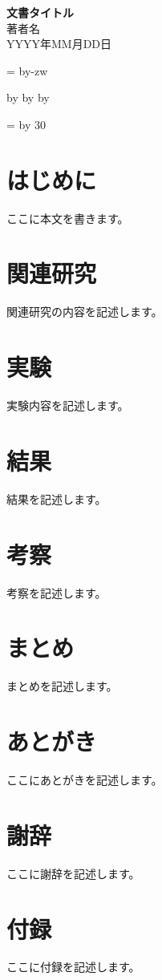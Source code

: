 \documentclass[a4paper,10.5pt]{jsarticle}
\makeatletter
\def\mojiparline#1{
    \newcounter{mpl}
    \setcounter{mpl}{#1}
    \@tempdima=\linewidth
    \advance\@tempdima by-\value{mpl}zw
    \addtocounter{mpl}{-1}
    \divide\@tempdima by \value{mpl}
    \advance\kanjiskip by\@tempdima
    \advance\parindent by\@tempdima
}
\def\linesparpage#1{
    \baselineskip=\textheight
    \divide\baselineskip by #1
}
\makeatother
\begin{document}
\begin{titlepage}
\centering
\vspace*{\fill}
{\Huge\bfseries 文書タイトル} \\[2cm]
	{\large 著者名} \\[0.5cm]
	\vspace*{\fill}
	{\large YYYY年MM月DD日} %
\end{titlepage}

\tableofcontents
\newpage
{} %
\mojiparline{40}
\linesparpage{30}

\section{はじめに}
ここに本文を書きます。

\section{関連研究}
関連研究の内容を記述します。

\section{実験}
実験内容を記述します。

\section{結果}
結果を記述します。

\section{考察}
考察を記述します。

\section{まとめ}
まとめを記述します。

\newpage




\newpage
\section*{あとがき}
ここにあとがきを記述します。

\newpage
\section*{謝辞}
ここに謝辞を記述します。

\newpage
\section*{付録}
ここに付録を記述します。
\end{document}

